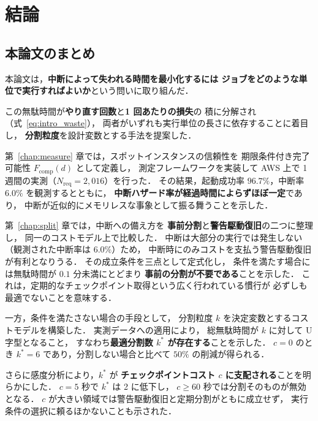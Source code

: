 \documentclass[11pt,a4paper]{ltjsreport}
\newcommand{\Fcomp}{F_{\mathrm{comp}}}
\newcommand{\Nreq}{N_{\mathrm{req}}}
\begin{document}
\chapter{結論}
\label{chap:conclusion}

\section{本論文のまとめ}

本論文は，\textbf{中断によって失われる時間を最小化するには
ジョブをどのような単位で実行すればよいか}という問いに取り組んだ．

この無駄時間が\textbf{やり直す回数}と\textbf{1 回あたりの損失}の
積に分解され（式~\eqref{eq:intro_waste}），
両者がいずれも実行単位の長さに依存することに着目し，
\textbf{分割粒度}を設計変数とする手法を提案した．

第~\ref{chap:measure} 章では，スポットインスタンスの信頼性を
期限条件付き完了可能性 $\Fcomp(d)$ として定義し，
測定フレームワークを実装して
AWS 上で 1 週間の実測（$\Nreq = 2{,}016$）を行った．
その結果，起動成功率 $96.7\%$，中断率 $6.0\%$ を観測するとともに，
\textbf{中断ハザード率が経過時間によらずほぼ一定}であり，
中断が近似的にメモリレスな事象として振る舞うことを示した．

第~\ref{chap:split} 章では，中断への備え方を
\textbf{事前分割}と\textbf{警告駆動復旧}の二つに整理し，
同一のコストモデル上で比較した．
中断は大部分の実行では発生しない（観測された中断率は $6.0\%$）ため，
中断時にのみコストを支払う警告駆動復旧が有利となりうる．
その成立条件を三点として定式化し，
条件を満たす場合には無駄時間が $0.1$ 分未満にとどまり
\textbf{事前の分割が不要である}ことを示した．
これは，定期的なチェックポイント取得という広く行われている慣行が
必ずしも最適でないことを意味する．

一方，条件を満たさない場合の手段として，
分割粒度 $k$ を決定変数とするコストモデルを構築した．
実測データへの適用により，
総無駄時間が $k$ に対して U 字型となること，
すなわち\textbf{最適分割数 $k^{*}$ が存在する}ことを示した．
$c = 0$ のとき $k^{*} = 6$ であり，分割しない場合と比べて
$50\%$ の削減が得られる．

さらに感度分析により，$k^{*}$ が
\textbf{チェックポイントコスト $c$ に支配される}ことを明らかにした．
$c = 5$ 秒で $k^{*}$ は 2 に低下し，
$c \geq 60$ 秒では分割そのものが無効となる．
$c$ が大きい領域では警告駆動復旧と定期分割がともに成立せず，
実行条件の選択に頼るほかないことも示された．
\end{document}
